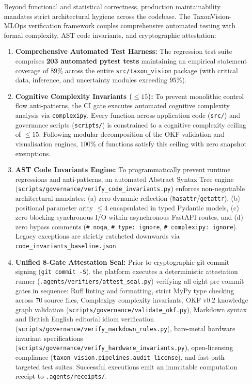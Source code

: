 Beyond functional and statistical correctness, production maintainability mandates strict architectural hygiene across the codebase. The TaxonVision-MLOps verification framework couples comprehensive automated testing with formal complexity, AST code invariants, and cryptographic attestation:
\begin{enumerate}
    \item \textbf{Comprehensive Automated Test Harness:} The regression test suite comprises \textbf{203 automated pytest tests} maintaining an empirical statement coverage of $89\%$ across the entire \nolinkurl{src/taxon_vision} package (with critical data, inference, and uncertainty modules exceeding $95\%$).
    \item \textbf{Cognitive Complexity Invariants ($\le 15$):} To prevent monolithic control flow anti-patterns, the CI gate executes automated cognitive complexity analysis via \texttt{complexipy}. Every function across application code (\nolinkurl{src/}) and governance scripts (\nolinkurl{scripts/}) is constrained to a cognitive complexity ceiling of $\le 15$. Following modular decomposition of the OKF validation and visualisation engines, $100\%$ of functions satisfy this ceiling with zero snapshot exemptions.
    \item \textbf{AST Code Invariants Engine:} To programmatically prevent runtime regressions and anti-patterns, an automated Abstract Syntax Tree engine (\nolinkurl{scripts/governance/verify_code_invariants.py}) enforces non-negotiable architectural mandates: (a) zero dynamic reflection (\texttt{hasattr}/\texttt{getattr}), (b) positional parameter arity $\le 4$ encapsulated in typed Pydantic models, (c) zero blocking synchronous I/O within asynchronous FastAPI routes, and (d) zero bypass comments (\texttt{\#~noqa}, \texttt{\#~type:\ ignore}, \texttt{\#~complexipy:\ ignore}). Legacy exceptions are strictly ratcheted downwards via \nolinkurl{code_invariants_baseline.json}.
    \item \textbf{Unified 8-Gate Attestation Seal:} Prior to cryptographic git commit signing (\texttt{git commit -S}), the platform executes a deterministic attestation runner (\nolinkurl{.agents/verifiers/attest_seal.py}) verifying all eight pre-commit gates in sequence: Ruff linting and formatting, strict MyPy type checking across 70 source files, Complexipy complexity invariants, OKF v0.2 knowledge graph validation (\nolinkurl{scripts/governance/validate_okf.py}), Markdown syntax and British English editorial idiom verification (\nolinkurl{scripts/governance/verify_markdown_rules.py}), bare-metal hardware invariant specifications (\nolinkurl{scripts/governance/verify_hardware_invariants.py}), open-licensing compliance (\nolinkurl{taxon_vision.pipelines.audit_license}), and fast-path targeted test suites. Successful executions emit an immutable computation receipt to \nolinkurl{.agents/receipts/}.
\end{enumerate}

